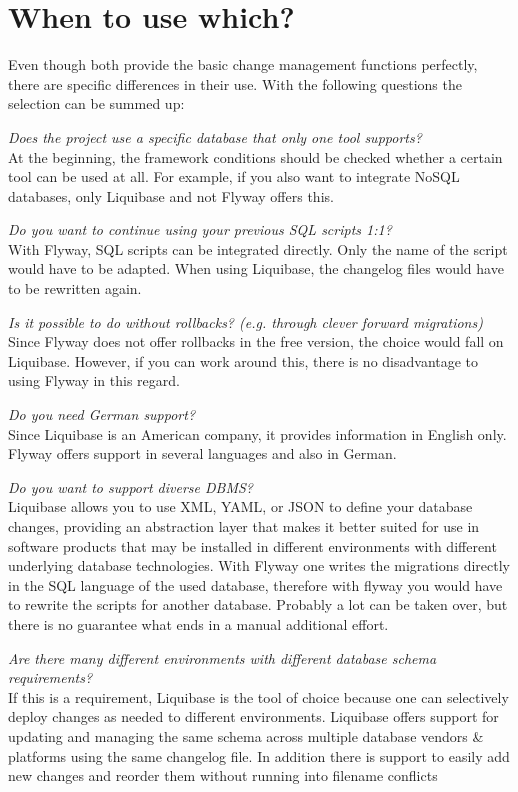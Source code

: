 \newpage
\section{When to use which?}

%
Even though both provide the basic change management functions perfectly,
there are specific differences in their use. With the following questions the selection can be summed up:

\textit{Does the project use a specific database that only one tool supports?}\\
At the beginning, the framework conditions should be checked whether a certain tool can be used at all. For example, if you also want to integrate NoSQL databases, only Liquibase and not Flyway offers this.

\textit{Do you want to continue using your previous SQL scripts 1:1?}\\
With Flyway, SQL scripts can be integrated directly. Only the name of the script would have to be adapted. When using Liquibase, the changelog files would have to be rewritten again.

\textit{Is it possible to do without rollbacks? (e.g. through clever forward migrations)}\\
Since Flyway does not offer rollbacks in the free version, the choice would fall on Liquibase. However, if you can work around this, there is no disadvantage to using Flyway in this regard.

\textit{Do you need German support?}\\
Since Liquibase is an American company, it provides information in English only. Flyway offers support in several languages and also in German.

\textit{Do you want to support diverse DBMS?}\\
Liquibase allows you to use XML, YAML, or JSON to define your database changes, providing an abstraction layer that makes it better suited for use in software products that may be installed in different environments with different underlying database technologies. With Flyway one writes the migrations directly in the SQL language of the used database, therefore with flyway you would have to rewrite the scripts for another database. Probably a lot can be taken over, but there is no guarantee what ends in a manual additional effort.

\textit{Are there many different environments with different database schema requirements?}\\
If this is a requirement, Liquibase is the tool of choice because one can selectively deploy changes as needed to different environments. 
Liquibase offers support for updating and managing the same schema across multiple database vendors \& platforms using the same changelog file.
In addition there is support to easily add new changes and reorder them without running into filename conflicts


\newpage